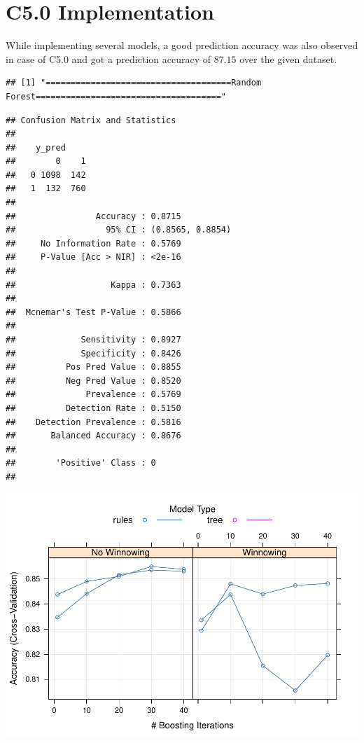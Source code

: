 \documentclass[
]{article}
\begin{document}
\section{C5.0 Implementation}

While implementing several models, a good prediction accuracy was also
observed in case of C5.0 and got a prediction accuracy of \(87.15%
\) over the given dataset.

\begin{verbatim}
## [1] "=====================================Random Forest====================================="
\end{verbatim}

\begin{verbatim}
## Confusion Matrix and Statistics
## 
##    y_pred
##        0    1
##   0 1098  142
##   1  132  760
##                                           
##                Accuracy : 0.8715          
##                  95% CI : (0.8565, 0.8854)
##     No Information Rate : 0.5769          
##     P-Value [Acc > NIR] : <2e-16          
##                                           
##                   Kappa : 0.7363          
##                                           
##  Mcnemar's Test P-Value : 0.5866          
##                                           
##             Sensitivity : 0.8927          
##             Specificity : 0.8426          
##          Pos Pred Value : 0.8855          
##          Neg Pred Value : 0.8520          
##              Prevalence : 0.5769          
##          Detection Rate : 0.5150          
##    Detection Prevalence : 0.5816          
##       Balanced Accuracy : 0.8676          
##                                           
##        'Positive' Class : 0               
## 
\end{verbatim}

\begin{center}\includegraphics[width=0.75\linewidth]{report_files/figure-latex/unnamed-chunk-2-1} \end{center}
\end{document}
